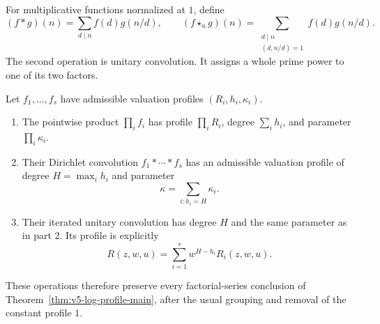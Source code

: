 For multiplicative functions normalized at $1$, define
\[
 (f*g)(n)=\sum_{d\mid n}f(d)g(n/d),\qquad
 (f\mathbin{\star_u}g)(n)=
       \sum_{\substack{d\mid n\\(d,n/d)=1}}f(d)g(n/d).
\]
The second operation is unitary convolution.  It assigns a whole prime
power to one of its two factors.

\begin{proposition}\label{v5:closure}
Let $f_1,\ldots,f_s$ have admissible valuation profiles
$(R_i,h_i,\kappa_i)$.
\begin{enumerate}
\item The pointwise product $\prod_i f_i$ has profile $\prod_i R_i$,
degree $\sum_i h_i$, and parameter $\prod_i\kappa_i$.
\item Their Dirichlet convolution $f_1*\cdots*f_s$ has an admissible
valuation profile of degree $H=\max_i h_i$ and parameter
\[
 \kappa=\sum_{i:h_i=H}\kappa_i.
\]
\item Their iterated unitary convolution has degree $H$ and the same
parameter as in part 2.  Its profile is explicitly
\[
 R(z,w,u)=\sum_{i=1}^s w^{H-h_i}R_i(z,w,u).
\]
\end{enumerate}
These operations therefore preserve every factorial-series conclusion of
Theorem~\ref{thm:v5-log-profile-main}, after the usual grouping and removal of
the constant profile $1$.
\end{proposition}
